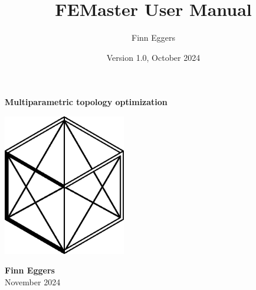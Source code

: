 \documentclass[10pt,a4paper]{book}
\title{FEMaster User Manual}
\author{Finn Eggers}
\date{Version 1.0, October 2024}
\begin{document}
\begin{titlepage}
\begin{center}

    \vspace*{2cm} %

    {\Huge \textbf{Multiparametric topology optimization}}
    \vspace{0.3cm}

    \vspace{1cm} %

    \includegraphics[width=0.4\textwidth]{logo/logo.eps} %

    \vfill  %

    \textbf{Finn Eggers} \\
    November 2024

\end{center}
\end{titlepage}

\newpage

\tableofcontents
\newpage



\newpage
\end{document}
